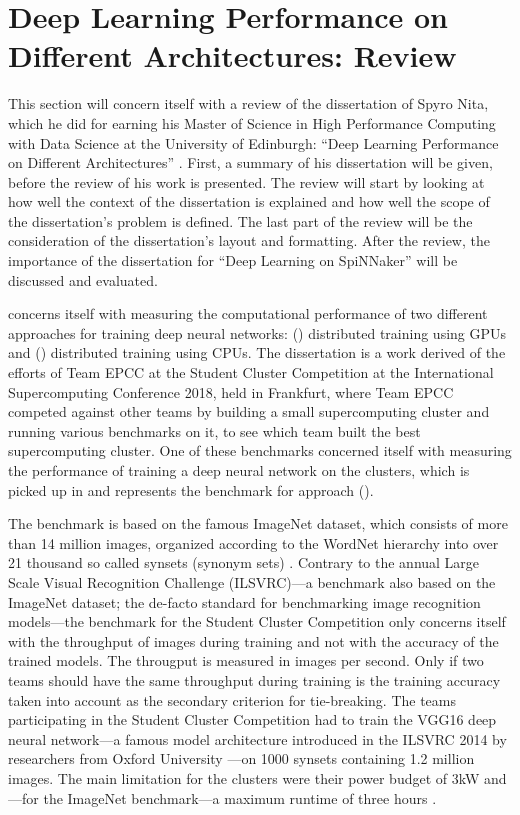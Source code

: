 \documentclass{article}
\begin{document}


\section{Deep Learning Performance on Different %
  Architectures: Review}
\label{sec:review}

This section will concern itself with a review of the
dissertation of Spyro Nita, which he did for earning his
Master of Science in High Performance Computing with Data
Science at the University of Edinburgh:
``Deep Learning Performance on Different Architectures''
 \citep{nita_2018}.
First, a summary of his dissertation will be given, before
the review of his work is presented.
The review will start by looking at how well the context
of the dissertation is explained and how well the scope
of the dissertation's problem is defined.
The last part of the review will be the consideration of
the dissertation's layout and formatting.
After the review, the importance of the dissertation for
``Deep Learning on SpiNNaker'' will be discussed and
evaluated.

\citet{nita_2018} concerns itself with measuring the
computational performance of two different approaches for
training deep neural networks: ()
distributed training using GPUs and ()
distributed training using CPUs.
The dissertation is a work derived of the efforts of
Team EPCC at the Student Cluster Competition at the
International Supercomputing Conference 2018, held in
Frankfurt, where Team EPCC competed against other teams by
building a small supercomputing cluster and running various
benchmarks on it, to see which team built the best
supercomputing cluster.
One of these benchmarks concerned itself with measuring the
performance of training a deep neural network on the
clusters, which is picked up in \citet{nita_2018} and
represents the benchmark for approach ().

The benchmark is based on the famous ImageNet dataset,
which consists of more than 14 million images, organized
according to the WordNet hierarchy into over 21 thousand
so called synsets (synonym sets) \citep{imagenet, wordnet}.
Contrary to the annual Large Scale Visual Recognition
Challenge (ILSVRC)---a benchmark also based on the ImageNet
dataset; the de-facto standard for benchmarking image
recognition models---the benchmark for the Student Cluster
Competition only concerns itself with the throughput of
images during training and not with the accuracy of the
trained models.
The througput is measured in images per second.
Only if two teams should have the same throughput during
training is the training accuracy taken into account as
the secondary criterion for tie-breaking.
The teams participating in the Student Cluster Competition
had to train the VGG16 deep neural network---a famous
model architecture introduced in the ILSVRC 2014 by
researchers from Oxford University
\citep{simonyan_et_al_2014}---on 1000 synsets containing
1.2 million images.
The main limitation for the clusters were their power
budget of 3kW and---for the ImageNet benchmark---a maximum
runtime of three hours \citep{nita_2018}.
\end{document}
